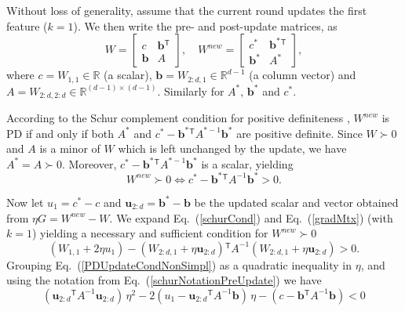 \documentclass{article} %
\newcommand\mat[1]{{#1}}
\renewcommand\vec[1]{\mathbf{#1}}
\newcommand{\T}{{}^\mathsf{T}}
\newcommand{\W}{\mat{W}}
\newcommand{\newW}{{\mat{W^{new}}}}
\newcommand{\R}{\mathbb{R}}
\newcommand{\B}{\vec{b}}
\newcommand{\C}{c}
\newcommand{\invA}{A^{-1}}
\newcommand{\uscalar}{{u}_{1}}
\newcommand{\uvec}{\vec{u}_{2:d}}
\newcommand{\Wvec}{\W_{2:d,1}}
\newcommand{\Wscalar}{\W_{1,1}}
\renewcommand{\eqref}[1]{Eq.~(\ref{#1})}
\begin{document}
Without loss of generality, assume that the current round updates
the first feature ($k = 1$). We then write the pre- and post-update
matrices, as
\begin{equation}
  \W = \left[ \begin{matrix} \C & \B\T \\ \B & A \end{matrix} \right],
  \quad
  \newW = \left[ \begin{matrix} \C^* & \B^*\T \\ \B^* & A^* \end{matrix} \right],
  \label{schurNotationPreUpdate}
\end{equation}
 where $\C = \Wscalar \in \R$ (a scalar), $\B = \Wvec \in
\R^{d-1}$ (a column vector) and $A = \W_{2:d,2:d} \in \R^{(d-1)
\times (d-1)}$. Similarly for $A^*$, $\B^*$ and $\C^*$.


According to the Schur complement condition for positive definiteness
\citep[p. 650]{boyd2004convex}, $\newW$ is PD if and only if both
$A^*$ and $\C^* - \B^*\T A^{*-1} \B^*$ are positive definite.
Since $W \succ 0$ and $A$ is a minor of $\W$ which is left unchanged by the update, we have $A^* =
A \succ 0$. Moreover, $\C^* - \B^*\T A^{*-1} \B^*$ is a
scalar, yielding
\begin{equation}
  \newW \succ  0 \Leftrightarrow  \C^* - \B^*\T \invA \B^* >  0.
  \label{schurCond}
\end{equation}
%

%
Now let $\uscalar = \C^* - \C$ and $\uvec = \B^* - \B$ be the updated scalar and vector
obtained from $\eta G = \newW - \W$. We expand \eqref{schurCond} and
\eqref{gradMtx} (with $k=1$) yielding a necessary and sufficient condition for $\newW \succ 0$
\begin{equation}
    (\Wscalar + 2\eta \uscalar)
    -(\Wvec + \eta \uvec)\T \invA (\Wvec + \eta \uvec)   > 0.
  \label{PDUpdateCondNonSimpl}
\end{equation}
Grouping \eqref{PDUpdateCondNonSimpl} as a quadratic inequality in $\eta$, and using the notation from \eqref{schurNotationPreUpdate} we have
\begin{equation}
\label{PDUpdateCondQuadForm}
(\uvec\T \invA \uvec) \, \eta^2 
-2(\uscalar - \uvec\T \invA \B) \,\eta 
-(\C - \B\T  \invA \B) < 0 
\end{equation}
\end{document}
